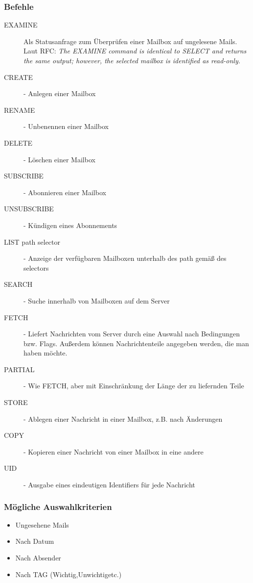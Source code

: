 \documentclass{article} %
\begin{document}
\subsubsection{Befehle}
	\begin{description}
	\item[EXAMINE] Als Statusanfrage zum Überprüfen einer Mailbox auf ungelesene Mails. \\
	Laut RFC: \textit{The EXAMINE command is identical to SELECT and returns the same output; however, the selected mailbox is identified as read-only.}
	\item[CREATE] - Anlegen einer Mailbox
	\item[RENAME] - Unbenennen einer Mailbox
	\item[DELETE] - Löschen einer Mailbox 
	\item[SUBSCRIBE] - Abonnieren einer Mailbox 
	\item[UNSUBSCRIBE] - Kündigen eines Abonnements
	\item[LIST path selector] - Anzeige der verfügbaren Mailboxen unterhalb des path gemäß des selectors 
	\item[SEARCH] - Suche innerhalb von Mailboxen auf dem Server
	\item[FETCH] - Liefert Nachrichten vom Server durch eine Auswahl nach Bedingungen bzw. Flags. Außerdem können Nachrichtenteile angegeben werden, die man haben möchte.
	\item[PARTIAL] - Wie FETCH, aber mit Einschränkung der Länge der zu liefernden Teile 
	\item[STORE] - Ablegen einer Nachricht in einer Mailbox, z.B. nach Änderungen 
	\item[COPY] - Kopieren einer Nachricht von einer Mailbox in eine andere
	\item[UID] - Ausgabe eines eindeutigen Identifiers für jede Nachricht
	\end{description}

\subsubsection{Mögliche Auswahlkriterien}
	\begin{itemize}
	\item Ungesehene Mails
	\item Nach Datum
	\item Nach Absender
	\item Nach TAG (\glqq Wichtig\grqq,\glqq Unwichtig\grqq etc.)
	\end{itemize}
\end{document}
